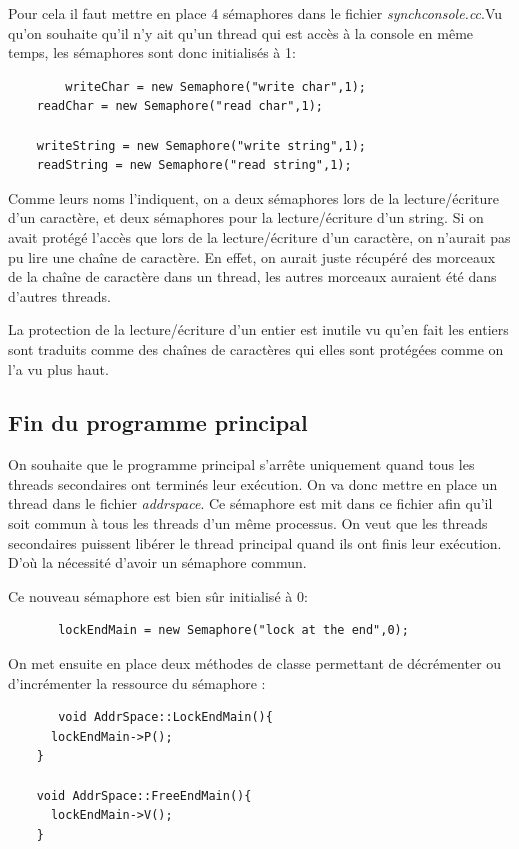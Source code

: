 \documentclass[a4paper,10pt]{report}
\begin{document}
      Pour cela il faut mettre en place 4 sémaphores dans le fichier \emph{synchconsole.cc}.Vu qu'on souhaite qu'il n'y ait qu'un thread qui est accès à la
      console en même temps, les sémaphores sont donc initialisés à 1:
      \begin{lstlisting}
       	writeChar = new Semaphore("write char",1);
	readChar = new Semaphore("read char",1);

	writeString = new Semaphore("write string",1);
	readString = new Semaphore("read string",1);
      \end{lstlisting}
      
      Comme leurs noms l'indiquent, on a deux sémaphores lors de la lecture/écriture d'un caractère, et deux sémaphores pour la lecture/écriture d'un string.
      Si on avait protégé l'accès que lors de la lecture/écriture d'un caractère, on n'aurait pas pu lire une chaîne de caractère. En effet, on aurait juste
      récupéré des morceaux de la chaîne de caractère dans un thread, les autres morceaux auraient été dans d'autres threads.
      
      La protection de la lecture/écriture d'un entier est inutile vu qu'en fait les entiers sont traduits comme des chaînes de caractères qui elles sont 
      protégées comme on l'a vu plus haut.
      
      \textcolor{NavyBlue}{\subsection{Fin du programme principal}}
      On souhaite que le programme principal s'arrête uniquement quand tous les threads secondaires ont terminés leur exécution. On va donc mettre en 
      place un thread dans le fichier \emph{addrspace}. Ce sémaphore est mit dans ce fichier afin qu'il soit commun à tous les threads d'un même processus.
      On veut que les threads secondaires puissent libérer le thread principal quand ils ont finis leur exécution. D'où la nécessité d'avoir un sémaphore
      commun.
      
      Ce nouveau sémaphore est bien sûr initialisé à 0:
      \begin{lstlisting}
       lockEndMain = new Semaphore("lock at the end",0);
      \end{lstlisting}
      \newpage
      On met ensuite en place deux méthodes de classe permettant de décrémenter ou d'incrémenter la ressource du sémaphore :
      \begin{lstlisting}
       void AddrSpace::LockEndMain(){
	  lockEndMain->P();
	}

	void AddrSpace::FreeEndMain(){
	  lockEndMain->V();
	}
      \end{lstlisting}
      
\end{document}
